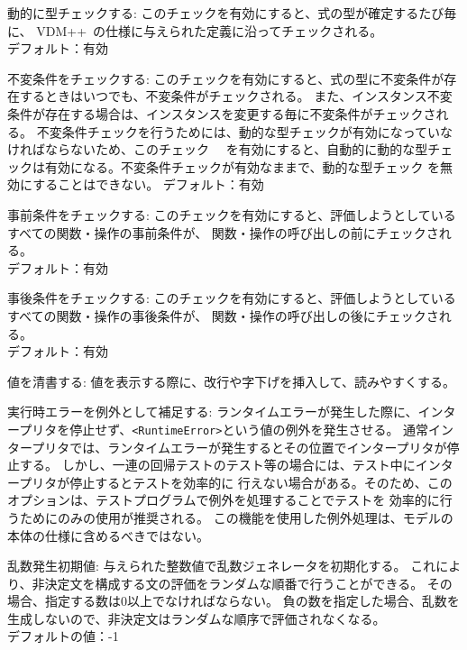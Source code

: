 \documentclass[\pformat,12pt]{jarticle}
\newcommand{\vdmslpp}{VDM++}
\newcommand{\guicmd}[1]{{\gt #1}}
\begin{document}
\begin{list}{}{}

\item[{\guicmd{動的に型チェックする}}:]
  このチェックを有効にすると、式の型が確定するたび毎に、
  \vdmslpp\ の仕様に与えられた定義に沿ってチェックされる。 \\
  デフォルト：有効

\item[{\guicmd{不変条件をチェックする}}:]
  このチェックを有効にすると、式の型に不変条件が存在するときはいつでも、不変条件がチェックされる。
  また、インスタンス不変条件が存在する場合は、インスタンスを変更する毎に不変条件がチェックされる。
  不変条件チェックを行うためには、動的な型チェックが有効になっていなければならないため、このチェック
　を有効にすると、自動的に動的な型チェックは有効になる。不変条件チェックが有効なままで、動的な型チェック
  を無効にすることはできない。
  デフォルト：有効
  
\item[{\guicmd{事前条件をチェックする}}:]
  このチェックを有効にすると、評価しようとしているすべての関数・操作の事前条件が、
  関数・操作の呼び出しの前にチェックされる。 \\
  デフォルト：有効
  
\item[{\guicmd{事後条件をチェックする}}:]
  このチェックを有効にすると、評価しようとしているすべての関数・操作の事後条件が、
  関数・操作の呼び出しの後にチェックされる。 \\
  デフォルト：有効
  
\item[{\guicmd{値を清書する}}:]
  値を表示する際に、改行や字下げを挿入して、読みやすくする。
  
\item[{\guicmd{実行時エラーを例外として補足する}}:]
  ランタイムエラーが発生した際に、インタープリタを停止せず、{\tt<RuntimeError>}という値の例外を発生させる。
  通常インタープリタでは、ランタイムエラーが発生するとその位置でインタープリタが停止する。
しかし、一連の回帰テストのテスト等の場合には、テスト中にインタープリタが停止するとテストを効率的に
行えない場合がある。そのため、このオプションは、テストプログラムで例外を処理することでテストを
効率的に行うためにのみの使用が推奨される。
この機能を使用した例外処理は、モデルの本体の仕様に含めるべきではない。

\item[{\guicmd{乱数発生初期値}}:]
与えられた整数値で乱数ジェネレータを初期化する。
これにより、非決定文を構成する文の評価をランダムな順番で行うことができる。
その場合、指定する数は0以上でなければならない。
負の数を指定した場合、乱数を生成しないので、非決定文はランダムな順序で評価されなくなる。 \\
デフォルトの値：-1


\end{list}
\end{document}
